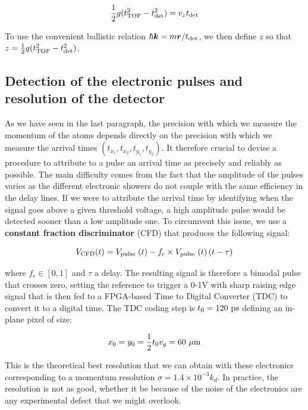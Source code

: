 \begin{equation}
    \frac{1}{2} g(t_{\rm{TOF}}^2-t_{\rm{det}}^2) = v_z t_{\rm{det}}
\end{equation}

\noindent To use the convenient ballistic relation $\hbar \bm{k} = m \bm{r}/t_{\rm{det}}$, we then define $z$ so that $z=\frac{1}{2} g(t_{\rm{TOF}}^2-t_{\rm{det}}^2)$.

\subsection{Detection of the electronic pulses and resolution of the detector}

As we have seen in the last paragraph, the precision with which we measure the momentum of the atoms depends directly on the precision with which we measure the arrival times $(t_{x_1},t_{x_2},t_{y_1},t_{y_2})$. It therefore crucial to devise a procedure to attribute to a pulse an arrival time as precisely and reliably as possible. The main difficulty comes from the fact that the amplitude of the pulses varies as the different electronic showers do not couple with the same efficiency in the delay lines. If we were to attribute the arrival time by identifying when the signal goes above a given threshold voltage, a high amplitude pulse would be detected sooner than a low amplitude one. To circumvent this issue, we use a \textbf{constant fraction discriminator} (CFD) that produces the following signal:

\begin{equation}
    V_{\rm{CFD}}(t)=V_{\text {pulse }}(t)-f_{c} \times V_{\text {pulse }}(t)\left(t-\tau\right)
\end{equation}

\noindent where $f_c \in [0,1]$ and $\tau$ a delay. The resulting signal is therefore a bimodal pulse that crosses zero, setting the reference to trigger a 0-1V with sharp raising edge signal that is then fed to a FPGA-based Time to Digital Converter (TDC) to convert it to a digital time. The TDC coding step is $t_0 = 120 \ \rm{ps}$ defining an in-plane pixel of size:

\begin{equation}
    x_0 = y_0 = \frac{1}{2} t_0 v_g = 60 \ \mu \rm{m}
\end{equation}

 \noindent This is the theoretical best resolution that we can obtain with these electronics corresponding to a momentum resolution $\sigma = 1.4 \times 10^{-3} k_d$. In practice, the resolution is not as good, whether it be because of the noise of the electronics are any experimental defect that we might overlook.
 
